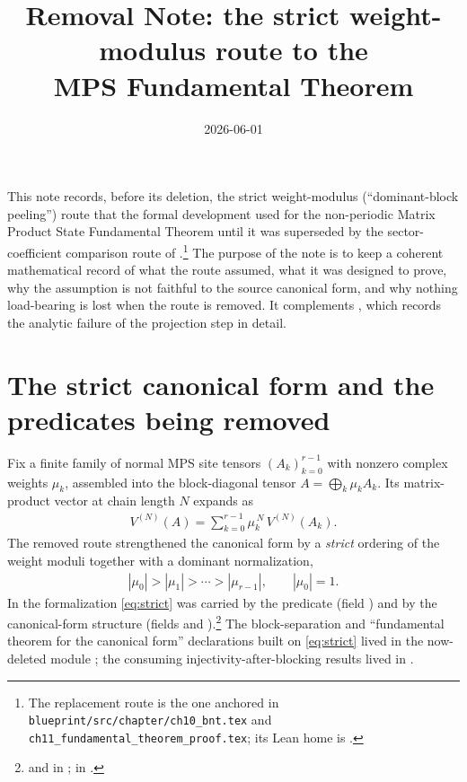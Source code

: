 \documentclass{article}
\title{Removal Note: the strict weight-modulus route to the\\
       MPS Fundamental Theorem}
\author{}
\date{2026-06-01}
\begin{document}
\maketitle

This note records, before its deletion, the strict weight-modulus
(``dominant-block peeling'') route that the formal development used for the
non-periodic Matrix Product State Fundamental Theorem until it was superseded by
the sector-coefficient comparison route of
\cite[\S II]{Cirac2016MPDO_arXiv}.\footnote{%
  The replacement route is the one anchored in
  \texttt{blueprint/src/chapter/ch10\_bnt.tex} and
  \texttt{ch11\_fundamental\_theorem\_proof.tex}; its Lean home is
  .}
The purpose of the note is to keep a coherent mathematical record of what the
route assumed, what it was designed to prove, why the assumption is not
faithful to the source canonical form, and why nothing load-bearing is lost when
the route is removed. It complements
, which records
the analytic failure of the projection step in detail.

\section{The strict canonical form and the predicates being removed}

Fix a finite family of normal MPS site tensors $(A_k)_{k=0}^{r-1}$ with nonzero
complex weights $\mu_k$, assembled into the block-diagonal tensor
$A=\bigoplus_k \mu_k A_k$. Its matrix-product vector at chain length $N$ expands
as
\begin{align}
    V^{(N)}(A) =  \sum_{k=0}^{r-1} \mu_k^{\,N}\, V^{(N)}(A_k).
    \label{eq:assemble}
\end{align}
The removed route strengthened the canonical form by a \emph{strict} ordering of
the weight moduli together with a dominant normalization,
\begin{align}
    |\mu_0| > |\mu_1| > \cdots > |\mu_{r-1}|,
    \qquad |\mu_0| = 1.
    \label{eq:strict}
\end{align}
In the formalization \eqref{eq:strict} was carried by the predicate
 (field
) and by the canonical-form structure
 (fields  and
).\footnote{%
   and
   in
  ;
   in
  .}
The block-separation and ``fundamental theorem for the canonical form''
declarations built on \eqref{eq:strict} lived in the now-deleted module
; the consuming
injectivity-after-blocking results lived in
.
\end{document}
